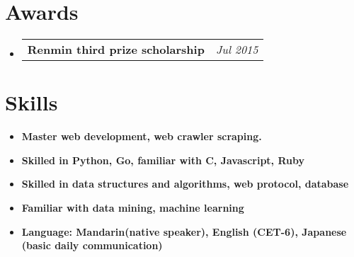 \documentclass[UTF8,11pt]{article}
\makeatletter
\newcommand{\resumeItem}[2]{
  \item\small{
    \textbf{#1}{ #2 \vspace{-2pt}}
  }
}
\newcommand{\resumeSubItem}[2]{\vspace{2pt}\resumeItem{#1}{#2}\vspace{-7pt}}
\newcommand{\resumeListSubItem}[2]{
  \vspace{-1pt}\item
    \begin{tabular*}{0.97\textwidth}{l@{\extracolsep{\fill}}r}
      \textbf{#1} & \textit{\small #2} \\
    \end{tabular*}\vspace{-6pt}
}
\newcommand{\resumeSubHeadingListStart}{\begin{itemize}[leftmargin=*]}
\newcommand{\resumeSubHeadingListEnd}{\end{itemize}}\vspace{-12pt}}
\makeatother
\begin{document}
\section{Awards}
  \resumeSubHeadingListStart
    \resumeListSubItem
      {Renmin third prize scholarship}{Jul 2015}
  \resumeSubHeadingListEnd
%
\section{Skills}
  \resumeSubHeadingListStart
    \resumeSubItem{Master web development, web crawler scraping.}
      {}
    \resumeSubItem{Skilled in Python, Go, familiar with C, Javascript, Ruby}
      {}
    \resumeSubItem{Skilled in data structures and algorithms, web protocol, database}
      {}
    \resumeSubItem{Familiar with data mining, machine learning}
      {}
    \resumeSubItem{Language: Mandarin(native speaker), English (CET-6), Japanese (basic daily communication)}
      {}
  \resumeSubHeadingListEnd


\end{document}
